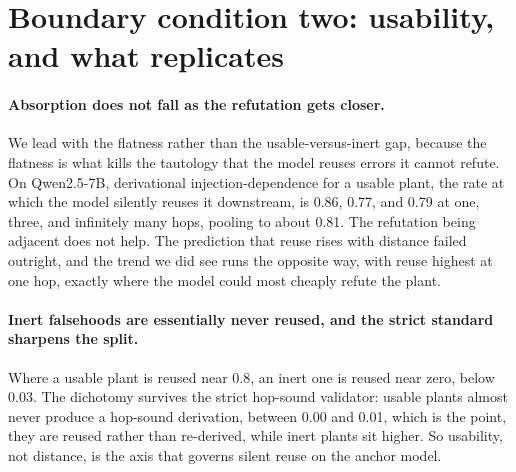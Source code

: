 \section{Boundary condition two: usability, and what replicates}
\label{sec:usability}


\paragraph{Absorption does not fall as the refutation gets closer.} We lead
with the flatness rather than the usable-versus-inert gap, because the
flatness is what kills the tautology that the model reuses errors it cannot
refute. On Qwen2.5-7B, derivational injection-dependence for a usable
plant, the rate at which the model silently reuses it downstream, is 0.86,
0.77, and 0.79 at one, three, and infinitely many hops, pooling to about
0.81.
The refutation being adjacent does not help. The prediction that reuse rises
with distance failed outright, and the trend we did see runs the opposite
way, with reuse highest at one hop, exactly where the model could most
cheaply refute the plant.

\paragraph{Inert falsehoods are essentially never reused, and the strict
standard sharpens the split.} Where a usable plant is reused near 0.8, an
inert one is reused near zero, below 0.03.
The dichotomy survives the strict hop-sound validator: usable plants almost
never produce a hop-sound derivation, between 0.00 and 0.01, which is the
point, they are reused rather than re-derived, while inert plants sit
higher.
So usability, not distance, is the axis that governs silent reuse on the
anchor model.

